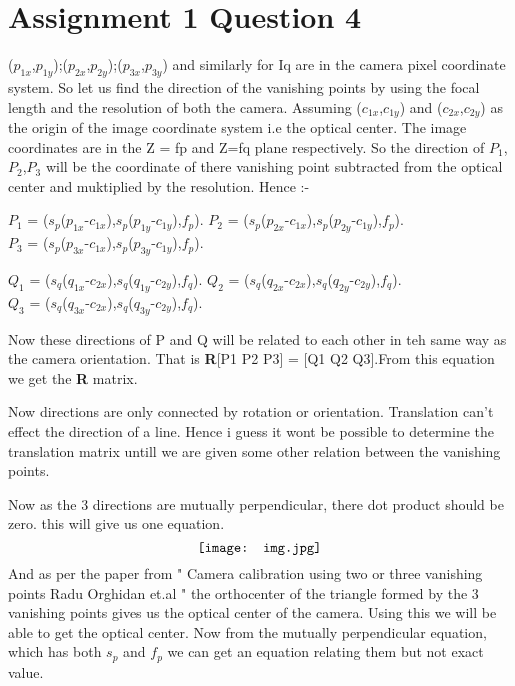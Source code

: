 \documentclass{article}
\begin{document}
\section{ Assignment 1 Question 4}
($p_{1x}$,$p_{1y}$);($p_{2x}$,$p_{2y}$);($p_{3x}$,$p_{3y}$) and similarly for Iq are in the camera pixel coordinate system. So let us find the direction of the vanishing points by using the focal length and the resolution of both the camera. Assuming ($c_{1x}$,$c_{1y}$) and ($c_{2x}$,$c_{2y}$) as the origin of the image coordinate system i.e the optical center.
The image coordinates are in the Z = fp and Z=fq plane respectively.
So the direction of $P_1$,$P_2$,$P_3$ will be the coordinate of there vanishing point subtracted from the optical center and muktiplied by the resolution. Hence :-

$P_1$ = ($s_p$($p_{1x}$-$c_{1x}$),$s_p$($p_{1y}$-$c_{1y}$),$f_p$).
 $P_2$ = ($s_p$($p_{2x}$-$c_{1x}$),$s_p$($p_{2y}$-$c_{1y}$),$f_p$).\\
  $P_3$ = ($s_p$($p_{3x}$-$c_{1x}$),$s_p$($p_{3y}$-$c_{1y}$),$f_p$).
  
   $Q_1$ = ($s_q$($q_{1x}$-$c_{2x}$),$s_q$($q_{1y}$-$c_{2y}$),$f_q$).
 $Q_2$ = ($s_q$($q_{2x}$-$c_{2x}$),$s_q$($q_{2y}$-$c_{2y}$),$f_q$).\\
  $Q_3$ = ($s_q$($q_{3x}$-$c_{2x}$),$s_q$($q_{3y}$-$c_{2y}$),$f_q$).
  
 Now these directions of P and Q will be related to each other in teh same way as the camera orientation. That is \textbf{R}[P1 P2 P3] = [Q1 Q2 Q3].From this equation we get the \textbf{R} matrix. 
 
 Now directions are only connected by rotation or orientation. Translation can't effect the direction of a line. Hence i guess it wont be possible to determine the translation matrix untill we are given some other relation between the vanishing points.

Now as the 3 directions are mutually perpendicular, there dot product should be zero. this will give us one equation. 
   $$\texttt{[image: img.jpg]}\\[0cm]
$$
And as per the paper from " Camera calibration using two or three vanishing points Radu Orghidan et.al " the orthocenter of the triangle formed by the 3 vanishing points gives us the optical center of the camera. 
Using this we will be able to get the optical center.
Now from the mutually perpendicular equation, which has both $s_p$ and $f_p$ we can get an equation relating them but not exact value.
\end{document}
